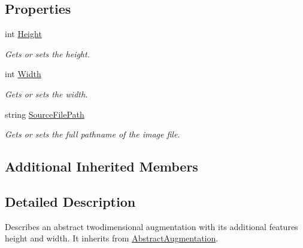 \subsection*{Properties}
\begin{DoxyCompactItemize}
\item 
int \hyperlink{class_a_rdev_kit_1_1_model_1_1_project_1_1_abstract2_d_augmentation_a14d016654e3824108d413c812f134539}{Height}
\begin{DoxyCompactList}\small\item\em Gets or sets the height. \end{DoxyCompactList}\item 
int \hyperlink{class_a_rdev_kit_1_1_model_1_1_project_1_1_abstract2_d_augmentation_abbc74c285b3d91be5841ce16473e2cd6}{Width}
\begin{DoxyCompactList}\small\item\em Gets or sets the width. \end{DoxyCompactList}\item 
string \hyperlink{class_a_rdev_kit_1_1_model_1_1_project_1_1_abstract2_d_augmentation_af2c60054c5ff96c677c84f33c8cb5f9a}{Source\-File\-Path}
\begin{DoxyCompactList}\small\item\em Gets or sets the full pathname of the image file. \end{DoxyCompactList}\end{DoxyCompactItemize}
\subsection*{Additional Inherited Members}


\subsection{Detailed Description}
Describes an abstract twodimensional augmentation with its additional features height and width. It inherits from \hyperlink{class_a_rdev_kit_1_1_model_1_1_project_1_1_abstract_augmentation}{Abstract\-Augmentation}. 



